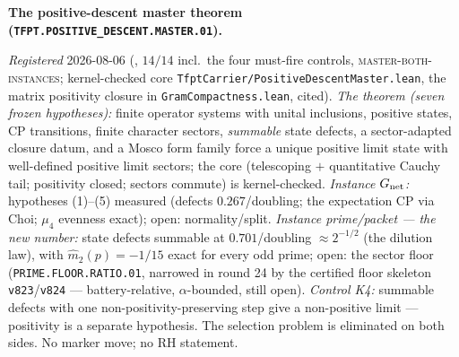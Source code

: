 \par\smallskip\noindent\textbf{The positive-descent master theorem
(\texttt{TFPT.POSITIVE\_DESCENT.MASTER.01}).}
{\sloppy
\emph{Registered} 2026-08-06
(, $14/14$ incl.\ the
four must-fire controls, \textsc{master-both-instances};
kernel-checked core \texttt{TfptCarrier/PositiveDescentMaster.lean},
the matrix positivity closure in \texttt{GramCompactness.lean},
cited).  \emph{The theorem (seven frozen hypotheses):} finite
operator systems with unital inclusions, positive states, CP
transitions, finite character sectors, \emph{summable} state
defects, a sector-adapted closure datum, and a Mosco form family
force a unique positive limit state with well-defined positive
limit sectors; the core (telescoping $+$ quantitative Cauchy
tail; positivity closed; sectors commute) is kernel-checked.
\emph{Instance $G_{\rm net}$:} hypotheses (1)--(5) measured
(defects $0.267$/doubling; the expectation CP via Choi; $\mu_4$
evenness exact); open: normality/split.  \emph{Instance
prime/packet --- the new number:} state defects summable at
$0.701$/doubling $\approx2^{-1/2}$ (the dilution law), with
$\hat m_2(p)=-1/15$ exact for every odd prime; open: the sector
floor (\texttt{PRIME.FLOOR.RATIO.01}, narrowed in round 24 by the
certified floor skeleton \texttt{v823}/\texttt{v824} ---
battery-relative, $\alpha$-bounded, still open).  \emph{Control K4:}
summable defects with one non-positivity-preserving step give a
non-positive limit --- positivity is a separate hypothesis.  The
selection problem is eliminated on both sides.  No marker move;
no RH statement.\par}


